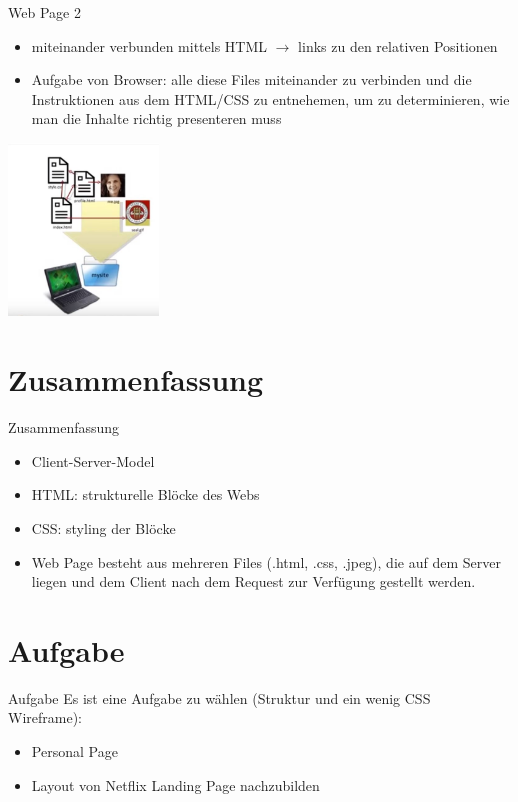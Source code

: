 \documentclass[12pt,xcolor={rgb}]{beamer}
\begin{document}
\begin{frame}{Web Page 2}
\begin{itemize}
\item miteinander verbunden mittels HTML
$\rightarrow$ links zu den relativen Positionen
\item Aufgabe von Browser: alle diese Files miteinander zu verbinden
und die Instruktionen aus dem HTML/CSS zu entnehemen, um zu determinieren,
wie man die Inhalte richtig presenteren muss
\end{itemize}
\includegraphics[width=4cm]{imgs/web_page.JPG}
\end{frame}

\section{Zusammenfassung}
\begin{frame}{Zusammenfassung}
\begin{itemize}
\item Client-Server-Model
\item HTML: strukturelle Blöcke des Webs
\item CSS: styling der Blöcke
\item Web Page besteht aus mehreren Files (.html, .css, .jpeg), die auf dem Server liegen und dem Client nach dem Request zur Verfügung gestellt werden.
\end{itemize}
\end{frame}


\section{Aufgabe}
\begin{frame}{Aufgabe}
Es ist eine Aufgabe zu wählen (Struktur und ein wenig CSS ~ Wireframe):
\begin{itemize}
\item Personal Page
\item Layout von Netflix Landing Page nachzubilden
\end{itemize}
\end{frame}
\end{document}
